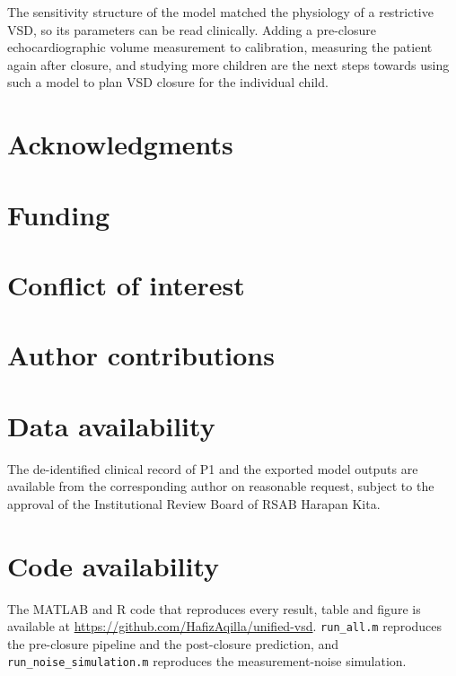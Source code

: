 The sensitivity structure of the model matched the physiology of a restrictive VSD, so its parameters can be read clinically. Adding a pre-closure echocardiographic volume measurement to calibration, measuring the patient again after closure, and studying more children are the next steps towards using such a model to plan VSD closure for the individual child.

\section*{Acknowledgments}

\section*{Funding}

\section*{Conflict of interest}

\section*{Author contributions}

\section*{Data availability}
The de-identified clinical record of P1 and the exported model outputs are available from the corresponding author on reasonable request, subject to the approval of the Institutional Review Board of RSAB Harapan Kita.

\section*{Code availability}
The MATLAB and R code that reproduces every result, table and figure is available at \url{https://github.com/HafizAqilla/unified-vsd}. \texttt{run\_all.m} reproduces the pre-closure pipeline and the post-closure prediction, and \texttt{run\_noise\_simulation.m} reproduces the measurement-noise simulation.

